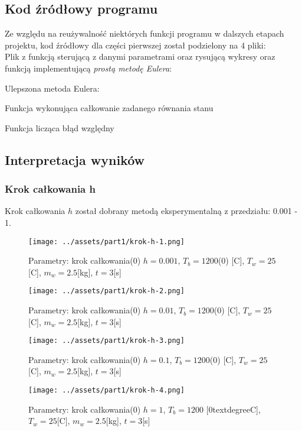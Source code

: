 \documentclass[
	12pt, %
]{fphw}
\begin{document}
\subsection{Kod źródłowy programu}
Ze względu na reużywalność niektórych funkcji programu w dalszych etapach projektu,
kod źródłowy dla części pierwszej został podzielony na 4 pliki: \\
Plik z funkcją sterującą z danymi parametrami oraz rysującą wykresy
oraz funkcją implementującą \textit{prostą metodę Eulera}:

Ulepszona metoda Eulera:

Funkcja wykonująca całkowanie zadanego równania stanu

Funkcja licząca błąd względny


\newpage

\subsection{Interpretacja wyników}

\subsubsection{Krok całkowania h}
Krok całkowania \(h\) został dobrany metodą eksperymentalną z przedziału: 0.001 - 1.

\begin{figure}[H]
	\texttt{[image: ../assets/part1/krok-h-1.png]}
	\caption{Parametry: krok całkowania(0) \(h = 0.001\), \(T_b = 1200\)(0) [\textdegree{}C], \(T_w = 25\)[\textdegree{}C], \(m_w = 2.5\)[kg], \(t = 3\)[s]}
	\label{fig:krok-1}
\end{figure}

\begin{figure}[H]
	\texttt{[image: ../assets/part1/krok-h-2.png]}
	\caption{Parametry: krok całkowania(0) \(h = 0.01\), \(T_b = 1200\)(0) [\textdegree{}C], \(T_w = 25\)[\textdegree{}C], \(m_w = 2.5\)[kg], \(t = 3\)[s]}
	\label{fig:krok-2}

	\texttt{[image: ../assets/part1/krok-h-3.png]}
	\caption{Parametry: krok całkowania(0) \(h = 0.1\), \(T_b = 1200\)(0) [\textdegree{}C], \(T_w = 25\)[\textdegree{}C], \(m_w = 2.5\)[kg], \(t = 3\)[s]}
	\label{fig:krok-3}
\end{figure}

\begin{figure}[H]
	\texttt{[image: ../assets/part1/krok-h-4.png]}
	\caption{Parametry: krok całkowania(0) \(h = 1\), \(T_b = 1200\) [\(0\)textdegree{}C], \(T_w = 25\)[\textdegree{}C], \(m_w = 2.5\)[kg], \(t = 3\)[s]}
	\label{fig:krok-4}
\end{figure}
\end{document}
